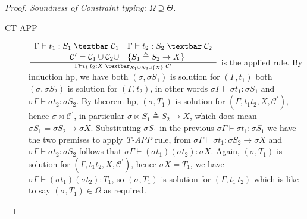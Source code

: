 \documentclass[8pt]{beamer}
\begin{document}
\begin{frame}
\begin{proof}[Proof. Soundness of Constraint typing: 
        $\Omega \supseteq \Theta$]
\begin{description}
            \item[CT-APP] ${{
                        \begin{array}{rl}
                          \Gamma \vdash t_{1}:S_{1} \; \textbar \;
                            \mathcal{C}_1  &
                        \Gamma \vdash  t_{2}:S_{2} \; \textbar \;
                            \mathcal{C}_2  \\
                         \mathcal{C}^{\prime} = \mathcal{C}_1 \cup 
                            \mathcal{C}_2
                            \cup & \{ S_1 \triangleq S_2 \rightarrow X 
                        \} \end{array}}\over
                        {\Gamma \vdash t_{1} \, t_{2} : X\;
                    \textbar_{\mathcal{X}_1 \cup \mathcal{X}_2 \cup
                        \{X\}} \; \mathcal{C}^{\prime} }}$ is the 
                        applied rule. By induction hp, we have both 
                        $(\sigma, \sigma S_1)$ is solution for 
                        $(\Gamma, t_1)$ both $(\sigma, \sigma S_2)$ is 
                        solution for $(\Gamma, t_2)$, in other words 
                        $\sigma \Gamma \vdash \sigma t_1 : \sigma S_1$ 
                        and $\sigma \Gamma \vdash \sigma t_2 : \sigma 
                        S_2$. By theorem hp, $(\sigma,T_1)$ is 
                        solution for $(\Gamma, t_1 t_2, X, 
                        \mathcal{C}^{\prime})$, hence $\sigma \Join 
                        \mathcal{C}^{\prime}$, in particular $\sigma 
                        \Join S_1\triangleq S_2\rightarrow X$, which 
                        does mean $\sigma S_1 = \sigma S_2 \rightarrow 
                        \sigma X$. Substituting $\sigma S_1$ in the 
                        previous $\sigma \Gamma \vdash \sigma t_1 : 
                        \sigma S_1$ we have the two premises to apply 
                        \emph{T-APP} rule, from $\sigma\Gamma \vdash
                        \sigma t_1:\sigma S_2 \rightarrow \sigma X$ 
                        and $\sigma \Gamma \vdash \sigma t_2 :\sigma 
                        S_2$ follows that $\sigma \Gamma \vdash 
                        (\sigma t_1) (\sigma t_2) : \sigma X$. Again, 
                        $(\sigma,T_1)$ is solution for $(\Gamma, t_1 
                        t_2, X, \mathcal{C}^{\prime})$, hence $\sigma 
                        X = T_1$, we have $\sigma \Gamma \vdash 
                        (\sigma t_1) (\sigma t_2) : T_1$, so $(\sigma, 
                        T_1)$ is solution for $(\Gamma, t_1 \, t_2)$
                        which is like to say $(\sigma, T_1)\in\Omega$ 
                        as required.
                
        \end{description}
    \end{proof}
    \normalsize
\end{frame}
\end{document}
